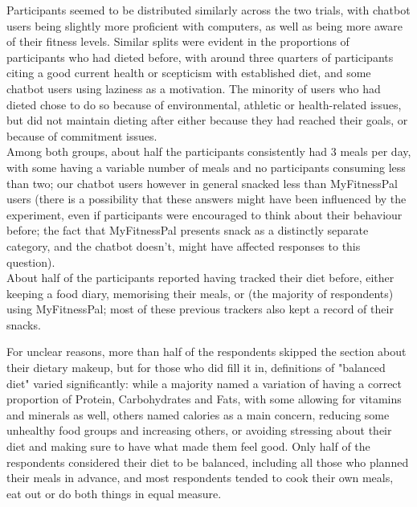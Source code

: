 Participants seemed to be distributed similarly across the two trials, with chatbot users being slightly more proficient with computers, as well as being more aware of their fitness levels. Similar splits were evident in the proportions of participants who had dieted before, with around three quarters of participants citing a good current health or scepticism with established diet, and some chatbot users using laziness as a motivation. The minority of users who had dieted chose to do so because of environmental, athletic or health-related issues, but did not maintain dieting after either because they had reached their goals, or because of commitment issues. \\
Among both groups, about half the participants consistently had 3 meals per day, with some having a variable number of meals and no participants consuming less than two; our chatbot users however in general snacked less than MyFitnessPal users (there is a possibility that these answers might have been influenced by the experiment, even if participants were encouraged to think about their behaviour before; the fact that MyFitnessPal presents snack as a distinctly separate category, and the chatbot doesn't, might have affected responses to this question). \\
About half of the participants reported having tracked their diet before, either keeping a food diary, memorising their meals, or (the majority of respondents) using MyFitnessPal; most of these previous trackers also kept a record of their snacks. 

For unclear reasons, more than half of the respondents skipped the section about their dietary makeup, but for those who did fill it in, definitions of "balanced diet" varied significantly: while a majority named a variation of having a correct proportion of Protein, Carbohydrates and Fats, with some allowing for vitamins and minerals as well, others named calories as a main concern, reducing some unhealthy food groups and increasing others, or avoiding stressing about their diet and making sure to have what made them feel good. Only half of the respondents considered their diet to be balanced, including all those who planned their meals in advance, and most respondents tended to cook their own meals, eat out or do both things in equal measure.

